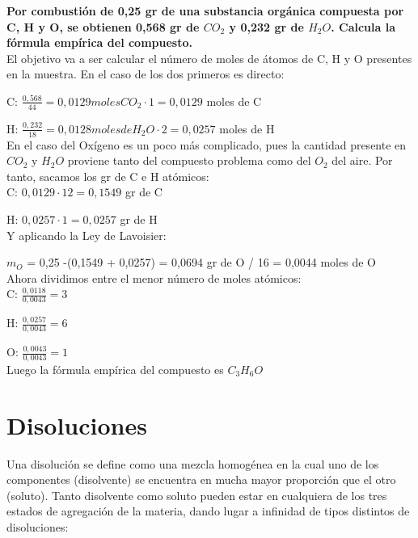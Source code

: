 \begin{exercise}
	\textbf{Por combustión de 0,25 gr de una substancia orgánica compuesta por C, H y O, se obtienen 0,568 gr de $CO_2$ y 0,232 gr de $H_2O$. Calcula la fórmula empírica del compuesto.}\\
	
	El objetivo va a ser calcular el número de moles de átomos de C, H y O presentes en la muestra. En el caso de los dos primeros es directo:
	
	C: $\frac{0,568}{44}  = 0,0129 moles CO_2 \cdot 1 = 0,0129$ moles de C
	
	H: $\frac{0,232}{18} = 0,0128 moles de H_2O \cdot 2 = 0,0257$ moles de H\\
	
	En el caso del Oxígeno es un poco más complicado, pues la cantidad presente en $CO_2$ y $H_2O$ proviene tanto del compuesto problema como del $O_2$ del aire. Por tanto, sacamos los gr de C e H atómicos:\\
	
	C: $0,0129\cdot 12 = 0,1549$ gr de C
	
	H: $0,0257\cdot 1 = 0,0257$ gr de H\\
	
	Y aplicando la Ley de Lavoisier:
	
	$m_O$ = 0,25 -(0,1549 + 0,0257) = 0,0694 gr de O / 16 = 0,0044 moles de O\\
	
	Ahora dividimos entre el menor número de moles atómicos:\\
	
	C: $\frac{0,0118}{0,0043} = 3$
	
	H: $\frac{0,0257}{0,0043} = 6$
	
	O: $\frac{0,0043}{0,0043} = 1$\\
	
	Luego la fórmula empírica del compuesto es $C_3H_6O$
	
\end{exercise}

\section{Disoluciones}

Una disolución se define como una mezcla homogénea en la cual uno de los componentes (disolvente) se encuentra en mucha mayor proporción que el otro (soluto). Tanto disolvente como soluto pueden estar en cualquiera de los tres estados de agregación de la materia, dando lugar a infinidad de tipos distintos de disoluciones:\\

